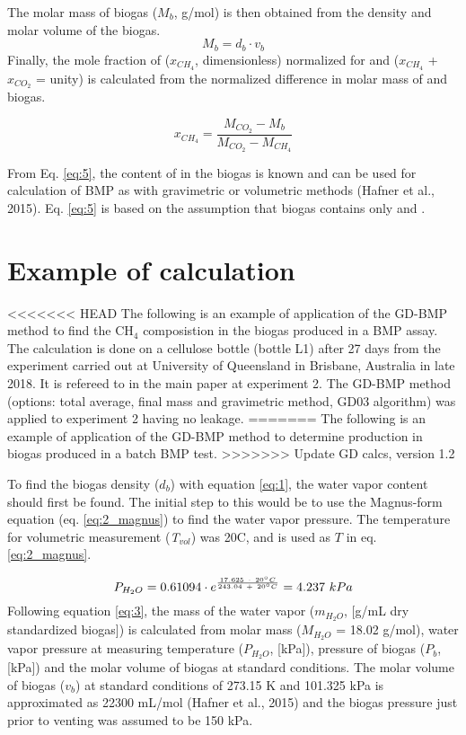 \documentclass[]{article}
\begin{document}
The molar mass of biogas ($M_b$, g/mol) is then obtained from the density and molar volume of the biogas.
\begin{equation}
  \label{eq:4}
  M_b=d_b \cdot v_b
\end{equation}
Finally, the mole fraction of  ($x_{CH_4}$, dimensionless) normalized for  and  ($x_{CH_4}$ + $x_{CO_2}$ = unity) is calculated from the normalized difference in molar mass of  and biogas.

\begin{equation}
  \label{eq:5}
  x_{CH_4}=\frac{M_{CO_2}-M_b}{M_{CO_2}-M_{CH_4}}
\end{equation}

From Eq. \ref{eq:5}, the content of  in the biogas is known and can be used for calculation of BMP as with gravimetric or volumetric methods (Hafner et al., 2015). 
Eq. \ref{eq:5} is based on the assumption that biogas contains only  and .

\section{Example of calculation} \label{s_example}
<<<<<<< HEAD
The following is an example of application of the GD-BMP method to find the CH$_4$ composistion in the biogas produced in a BMP assay. The calculation is done on a cellulose bottle (bottle L1) after 27 days from the experiment carried out at University of Queensland in Brisbane, Australia in late 2018. It is refereed to in the main paper at experiment 2.
The GD-BMP method (options: total average, final mass and gravimetric method, GD03 algorithm) was applied to experiment 2 having no leakage.
=======
The following is an example of application of the GD-BMP method to determine  production in biogas produced in a batch BMP test. 
>>>>>>> Update GD calcs, version 1.2

To find the biogas density ($d_b$) with equation \ref{eq:1}, the water vapor content should first be found. 
The initial step to this would be to use the Magnus-form equation (eq. \ref{eq:2_magnus}) to find the water vapor pressure. 
The temperature for volumetric measurement (\textit{T}$_{vol}$) was 20\degree C, and is used as $T$ in eq. \ref{eq:2_magnus}.

\begin{equation*}
\centering
   P_{H_2O} = 0.61094 \cdot e^{\frac{17.625\ \cdot\ 20 \degree C}{243.04\ +\ 20 \degree C}} = 4.237\ kPa
\end{equation*}
Following equation \ref{eq:3}, the mass of the water vapor ($m_{H_2O}$, [g/mL dry standardized biogas]) is calculated from molar mass ($M_{H_2O}$ = 18.02 g/mol), water vapor pressure at measuring temperature ($P_{H_2O}$, [kPa]), pressure of biogas ($P_b$, [kPa]) and the molar volume of biogas at standard conditions. 
The molar volume of biogas ($v_b$) at standard conditions of 273.15 \degree K and 101.325 kPa is approximated as 22300 mL/mol (Hafner et al., 2015) and the biogas pressure just prior to venting was assumed to be 150 kPa.
\end{document}
